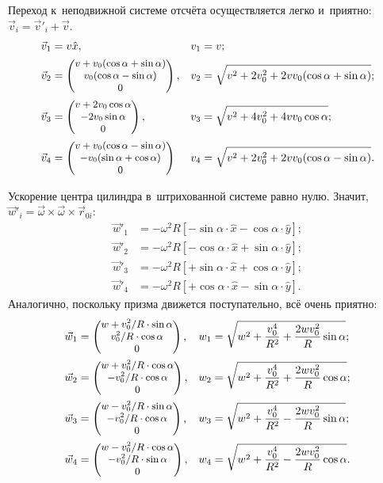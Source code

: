 \documentclass{weekly}
\begin{document}
Переход к~неподвижной системе отсчёта осуществляется легко и~приятно:
$\vec v_i = \vec v'_i + \vec v$.
\begin{align}
    \vec v_1 &= v \hat x, & \label{2.11:v1}
        v_1 &= v; \\
    \vec v_2 &= \small\begin{pmatrix}v + v_0 (\cos\alpha + \sin\alpha)\\v_0 (\cos\alpha - \sin\alpha)\\0\end{pmatrix}, & \label{2.11:v2}
        v_2 &= \sqrt{v^2 + 2v_0^2 +
            2vv_0 (\cos\alpha + \sin\alpha)}; \\
    \vec v_3 &= \small\begin{pmatrix}v + 2v_0 \cos\alpha\\-2v_0 \sin\alpha\\0\end{pmatrix}, &
        \label{2.11:v3}
        v_3 &= \sqrt{v^2 + 4v_0^2 + 4vv_0 \cos\alpha}; \\
    \vec v_4 &= \small\begin{pmatrix}v + v_0 (\cos\alpha - \sin\alpha)\\-v_0 (\sin\alpha + \cos\alpha)\\0\end{pmatrix} & \label{2.11:v4}
        v_4 &= \sqrt{v^2 + 2v_0^2 + 2vv_0 (\cos\alpha - \sin\alpha)}.
\end{align}

Ускорение центра цилиндра в~штрихованной системе равно нулю.
Значит, $\vec w'_i = \vec\omega \times \vec\omega \times \vec r_{0i}$:
\begin{align}
    \vec w'_1 &= -\omega^2 R \left[ -\sin\alpha \cdot \hat x -
            \cos\alpha \cdot \hat y \right]; \\
    \vec w'_2 &= -\omega^2 R \left[ -\cos\alpha \cdot \hat x +
            \sin\alpha \cdot \hat y \right]; \\
    \vec w'_3 &= -\omega^2 R \left[ +\sin\alpha \cdot \hat x +
            \cos\alpha \cdot \hat y \right]; \\
    \vec w'_4 &= -\omega^2 R \left[ +\cos\alpha \cdot \hat x -
            \sin\alpha \cdot \hat y \right].
\end{align}
Аналогично, поскольку призма движется поступательно, всё очень приятно:
\begin{align}
    \vec w_1 &= \small\begin{pmatrix}w + v_0^2/R \cdot \sin\alpha\\v_0^2/R \cdot \cos\alpha\\0\end{pmatrix}, & \label{2.11:w1}
        w_1 &= \sqrt{w^2 + \frac{v_0^4}{R^2} +
            \frac{2wv_0^2}{R}\sin\alpha}; \\
    \vec w_2 &= \small\begin{pmatrix}w + v_0^2/R \cdot \cos\alpha\\-v_0^2/R \cdot \cos\alpha\\0\end{pmatrix}, & \label{2.11:w2}
        w_2 &= \sqrt{w^2 + \frac{v_0^4}{R^2} +
            \frac{2wv_0^2}{R}\cos\alpha}; \\
    \vec w_3 &= \small\begin{pmatrix}w - v_0^2/R \cdot \sin\alpha\\-v_0^2/R \cdot \cos\alpha\\0\end{pmatrix}, & \label{2.11:w3}
        w_3 &= \sqrt{w^2 + \frac{v_0^4}{R^2} -
            \frac{2wv_0^2}{R}\sin\alpha}; \\
    \vec w_4 &= \small\begin{pmatrix}w - v_0^2/R \cdot \cos\alpha\\-v_0^2/R \cdot \sin\alpha\\0\end{pmatrix}, & \label{2.11:w4}
        w_4 &= \sqrt{w^2 + \frac{v_0^4}{R^2} -
            \frac{2wv_0^2}{R}\cos\alpha}.
\end{align}
\end{document}
